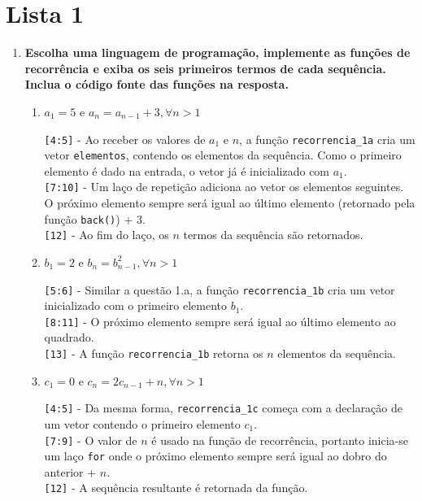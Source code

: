 \section*{Lista 1}

\begin{enumerate}
	\item \textbf{Escolha uma linguagem de programação, implemente as funções de
	recorrência e exiba os seis primeiros termos de cada sequência. Inclua o código fonte das funções na resposta.}
	\begin{enumerate}
		\item $a_1 = 5$ e $a_n = a_{n-1}+3, \forall n > 1$
		
		\verb|[4:5]| - Ao receber os valores de $a_1$ e $n$, a função \verb|recorrencia_1a| cria um vetor \verb|elementos|, contendo os elementos da sequência. Como o primeiro elemento é dado na entrada, o vetor já é inicializado com $a_1$.\\
		\verb|[7:10]| - Um laço de repetição adiciona ao vetor os elementos seguintes. O próximo elemento sempre será igual ao último elemento (retornado pela função \verb|back()|) + 3.\\
		\verb|[12]| - Ao fim do laço, os $n$ termos da sequência são retornados.

		\item $b_1 = 2$ e $b_n = b_{n-1}^2, \forall n > 1$
		
		\verb|[5:6]| - Similar a questão 1.a, a função \verb|recorrencia_1b| cria um vetor inicializado com o primeiro elemento $b_1$.\\
		\verb|[8:11]| - O próximo elemento sempre será igual ao último elemento ao quadrado.\\
		\verb|[13]| - A função \verb|recorrencia_1b| retorna os $n$ elementos da sequência.

		\item $c_1 = 0$ e $c_n = 2c_{n-1}+n, \forall n > 1$
		
		\verb|[4:5]| - Da mesma forma, \verb|recorrencia_1c| começa com a declaração de um vetor contendo o primeiro elemento $c_1$.\\
		\verb|[7:9]| - O valor de $n$ é usado na função de recorrência, portanto inicia-se um laço \verb|for| onde o próximo elemento sempre será igual ao dobro do anterior + $n$.\\
		\verb|[12]| - A sequência resultante é retornada da função.
	\end{enumerate}


\end{enumerate}
